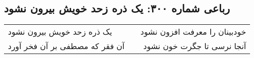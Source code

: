 \begin{center}
\section*{رباعی شماره ۳۰۰: یک ذره زحد خویش بیرون نشود}
\label{sec:sh300}
\begin{longtable}{l p{0.5cm} r}
یک ذره زحد خویش بیرون نشود
&&
خودبینان را معرفت افزون نشود
\\
آن فقر که مصطفی بر آن فخر آورد
&&
آنجا نرسی تا جگرت خون نشود
\\
\end{longtable}
\end{center}
